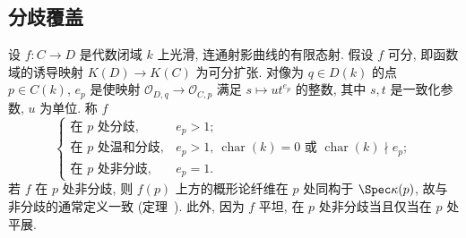 \subsection{分歧覆盖}\label{src:6.7.1-subsection}
设 $f:C\to\allowbreak D$ 是代数闭域 $k$ 上光滑, 连通射影曲线的有限态射. 假设 $f$ 可分, 即函数域的诱导映射 $K(D)\to\allowbreak K(C)$ 为可分扩张. 对像为 $q\in D(k)$ 的点 $p\in C(k)$,  $e_p$ 是使映射 $\mathcal O_{D,\allowbreak q}\to\mathcal O_{C,\allowbreak p}$ 满足 $s\mapsto ut^{e_p}$ 的整数, 其中 $s,\allowbreak t$ 是一致化参数, $u$ 为单位. 称 $f$
\[
\begin{cases}
\text{在 }p\text{ 处分歧},&e_p>1;\\
\text{在 }p\text{ 处温和分歧},&e_p>1,\ \operatorname{char}(k)=0\text{ 或 }\operatorname{char}(k)\nmid e_p;\\
\text{在 }p\text{ 处非分歧},&e_p=1.
\end{cases}
\]
若 $f$ 在 $p$ 处非分歧, 则 $f(p)$ 上方的概形论纤维在 $p$ 处同构于 $\Spec\kappa(p)$, 故与非分歧的通常定义一致 (定理~). 此外, 因为 $f$ 平坦, 在 $p$ 处非分歧当且仅当在 $p$ 处平展.

